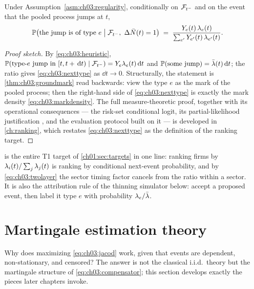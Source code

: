 \begin{proposition}\label{prop:ch03:nexttype}
Under Assumption~\ref{asm:ch03:regularity}, conditionally on $\mathcal{F}_{t^-}$ and on the event
that the pooled process jumps at $t$,
\begin{equation}\label{eq:ch03:nexttype}
\mathbb{P}\big(\text{the jump is of type } e \;\big|\; \mathcal{F}_{t^-},\ \Delta\bar N(t)=1\big)
 \;=\;
 \frac{Y_e(t)\,\lambda_e(t)}{\sum_{e'} Y_{e'}(t)\,\lambda_{e'}(t)} .
\end{equation}
\end{proposition}

\begin{proof}[Proof sketch]
By \cref{eq:ch03:heuristic}, $\mathbb{P}(\text{type-}e \text{ jump in }
[t,t+\,\mathrm{d} t) \mid \mathcal{F}_{t^-}) = Y_e\lambda_e(t)\,\mathrm{d} t$ and
$\mathbb{P}(\text{some jump}) = \bar{\lambda}(t)\,\mathrm{d} t$; the ratio gives
\cref{eq:ch03:nexttype} as $\dd t \to 0$. Structurally, the statement is
\cref{thm:ch03:groundmark} read backwards: view the type $e$ as the mark
of the pooled process; then the right-hand side of
\cref{eq:ch03:nexttype} is exactly the mark density
\cref{eq:ch03:markdensity}. The full measure-theoretic proof, together
with its operational consequences --- the risk-set conditional logit, its
partial-likelihood justification \citep{cox1975,mcfadden1974}, and the
evaluation protocol built on it --- is developed in \cref{ch:ranking},
which restates \cref{eq:ch03:nexttype} as the definition of the ranking
target.
\end{proof}

 is the entire T1 target of
\cref{ch01:sec:targets} in one line: ranking firms by
$\lambda_i(t)/\sum_j \lambda_j(t)$ is ranking by conditional next-event
probability, and by \cref{eq:ch03:twolayer} the sector timing factor
cancels from the ratio within a sector. It is also the attribution rule of
the thinning simulator below: accept a proposed event, then label it type
$e$ with probability $\lambda_e/\bar{\lambda}$.

\section{Martingale estimation theory}\label{ch03:sec:estimation}

Why does maximizing \cref{eq:ch03:jacod} work, given that events are
dependent, non-stationary, and censored? The answer is not the classical
i.i.d.\ theory but the martingale structure of
\cref{eq:ch03:compensator}; this section develops exactly the pieces later
chapters invoke.

